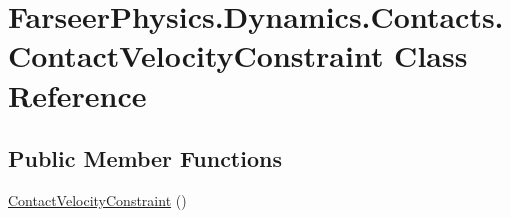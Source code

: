 \hypertarget{class_farseer_physics_1_1_dynamics_1_1_contacts_1_1_contact_velocity_constraint}{\section{Farseer\+Physics.\+Dynamics.\+Contacts.\+Contact\+Velocity\+Constraint Class Reference}
\label{class_farseer_physics_1_1_dynamics_1_1_contacts_1_1_contact_velocity_constraint}
}
\subsection*{Public Member Functions}
\begin{DoxyCompactItemize}
\item 
\hyperlink{class_farseer_physics_1_1_dynamics_1_1_contacts_1_1_contact_velocity_constraint_aa7dfd2532b401206c63c92d4ea9a4b59}{Contact\+Velocity\+Constraint} ()
\end{DoxyCompactItemize}
